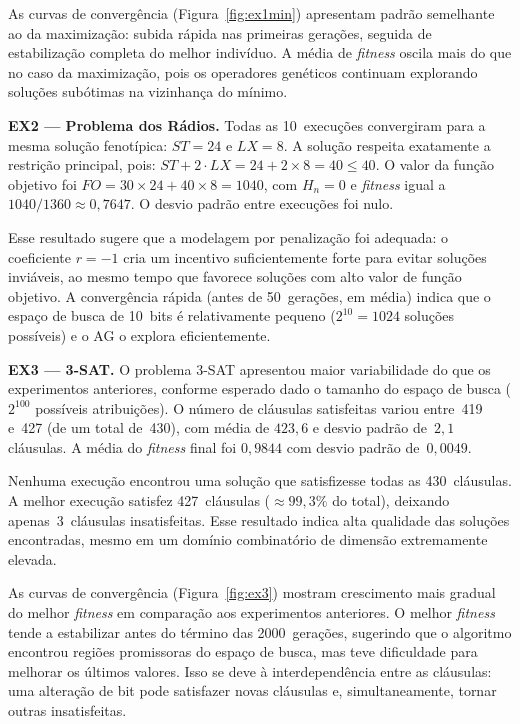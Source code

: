 \documentclass[12pt,twocolumn]{article}
\begin{document}
As curvas de convergência (Figura~\ref{fig:ex1min}) apresentam padrão semelhante ao da
maximização: subida rápida nas primeiras gerações, seguida de estabilização completa do
melhor indivíduo. A média de \textit{fitness} oscila mais do que no caso da maximização,
pois os operadores genéticos continuam explorando soluções subótimas na vizinhança do
mínimo.

\textbf{EX2 --- Problema dos Rádios.}
Todas as 10~execuções convergiram para a mesma solução fenotípica: $ST = 24$ e
$LX = 8$. A solução respeita exatamente a restrição principal, pois:
$ST + 2 \cdot LX = 24 + 2 \times 8 = 40 \le 40$. O valor da função objetivo foi
$FO = 30 \times 24 + 40 \times 8 = 1040$, com $H_n = 0$ e \textit{fitness} igual
a $1040/1360 \approx 0{,}7647$. O desvio padrão entre execuções foi nulo.

Esse resultado sugere que a modelagem por penalização foi adequada: o coeficiente
$r = -1$ cria um incentivo suficientemente forte para evitar soluções inviáveis, ao mesmo
tempo que favorece soluções com alto valor de função objetivo. A convergência rápida
(antes de 50~gerações, em média) indica que o espaço de busca de 10~bits é relativamente
pequeno ($2^{10} = 1024$ soluções possíveis) e o AG o explora eficientemente.

\textbf{EX3 --- 3-SAT.}
O problema 3-SAT apresentou maior variabilidade do que os experimentos anteriores,
conforme esperado dado o tamanho do espaço de busca ($2^{100}$ possíveis atribuições).
O número de cláusulas satisfeitas variou entre~419 e~427 (de um total de~430), com média
de $423{,}6$ e desvio padrão de~$2{,}1$ cláusulas. A média do \textit{fitness} final foi
$0{,}9844$ com desvio padrão de~$0{,}0049$.

Nenhuma execução encontrou uma solução que satisfizesse todas as 430~cláusulas. A melhor
execução satisfez 427~cláusulas ($\approx 99{,}3\%$ do total), deixando apenas~3~cláusulas
insatisfeitas. Esse resultado indica alta qualidade das soluções encontradas, mesmo em um
domínio combinatório de dimensão extremamente elevada.

As curvas de convergência (Figura~\ref{fig:ex3}) mostram crescimento mais gradual do
melhor \textit{fitness} em comparação aos experimentos anteriores. O melhor \textit{fitness}
tende a estabilizar antes do término das 2000~gerações, sugerindo que o algoritmo encontrou
regiões promissoras do espaço de busca, mas teve dificuldade para melhorar os últimos valores.
Isso se deve à interdependência entre as cláusulas: uma alteração de bit pode satisfazer
novas cláusulas e, simultaneamente, tornar outras insatisfeitas.
\end{document}
